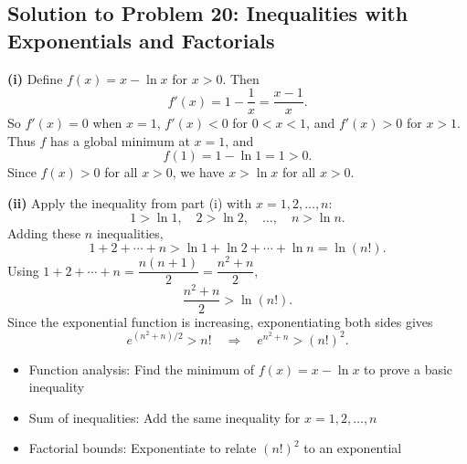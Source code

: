 \subsection{Solution to Problem 20: Inequalities with Exponentials and Factorials}

\begin{solution}
\textbf{(i)} Define $f(x) = x - \ln x$ for $x > 0$. Then
\[
f'(x) = 1 - \frac{1}{x} = \frac{x-1}{x}.
\]
So $f'(x) = 0$ when $x = 1$, $f'(x) < 0$ for $0 < x < 1$, and $f'(x) > 0$ for $x > 1$.
Thus $f$ has a global minimum at $x = 1$, and
\[
f(1) = 1 - \ln 1 = 1 > 0.
\]
Since $f(x) > 0$ for all $x > 0$, we have $x > \ln x$ for all $x > 0$.

\textbf{(ii)} Apply the inequality from part (i) with $x = 1, 2, \ldots, n$:
\[
1 > \ln 1, \quad 2 > \ln 2, \quad \ldots, \quad n > \ln n.
\]
Adding these $n$ inequalities,
\[
1 + 2 + \cdots + n > \ln 1 + \ln 2 + \cdots + \ln n = \ln(n!).
\]
Using $1 + 2 + \cdots + n = \dfrac{n(n+1)}{2} = \dfrac{n^2+n}{2}$,
\[
\frac{n^2+n}{2} > \ln(n!).
\]
Since the exponential function is increasing, exponentiating both sides gives
\[
e^{(n^2+n)/2} > n!
\quad\Longrightarrow\quad
e^{n^2+n} > (n!)^2.
\]
\end{solution}

\begin{takeaways}
\begin{itemize}
    \item Function analysis: Find the minimum of $f(x)=x-\ln x$ to prove a basic inequality
    \item Sum of inequalities: Add the same inequality for $x=1,2,\ldots,n$
    \item Factorial bounds: Exponentiate to relate $(n!)^2$ to an exponential
\end{itemize}
\end{takeaways}
